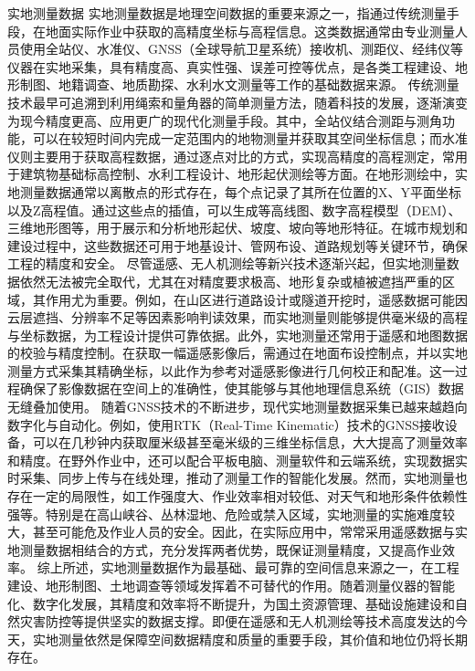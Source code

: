 {{实地测量数据}\label{ux5b9eux5730ux6d4bux91cfux6570ux636e}
实地测量数据是地理空间数据的重要来源之一，指通过传统测量手段，在地面实际作业中获取的高精度坐标与高程信息。这类数据通常由专业测量人员使用全站仪、水准仪、GNSS（全球导航卫星系统）接收机、测距仪、经纬仪等仪器在实地采集，具有精度高、真实性强、误差可控等优点，是各类工程建设、地形制图、地籍调查、地质勘探、水利水文测量等工作的基础数据来源。
传统测量技术最早可追溯到利用绳索和量角器的简单测量方法，随着科技的发展，逐渐演变为现今精度更高、应用更广的现代化测量手段。其中，全站仪结合测距与测角功能，可以在较短时间内完成一定范围内的地物测量并获取其空间坐标信息；而水准仪则主要用于获取高程数据，通过逐点对比的方式，实现高精度的高程测定，常用于建筑物基础标高控制、水利工程设计、地形起伏测绘等方面。在地形测绘中，实地测量数据通常以离散点的形式存在，每个点记录了其所在位置的X、Y平面坐标以及Z高程值。通过这些点的插值，可以生成等高线图、数字高程模型（DEM）、三维地形图等，用于展示和分析地形起伏、坡度、坡向等地形特征。在城市规划和建设过程中，这些数据还可用于地基设计、管网布设、道路规划等关键环节，确保工程的精度和安全。
尽管遥感、无人机测绘等新兴技术逐渐兴起，但实地测量数据依然无法被完全取代，尤其在对精度要求极高、地形复杂或植被遮挡严重的区域，其作用尤为重要。例如，在山区进行道路设计或隧道开挖时，遥感数据可能因云层遮挡、分辨率不足等因素影响判读效果，而实地测量则能够提供毫米级的高程与坐标数据，为工程设计提供可靠依据。此外，实地测量还常用于遥感和地图数据的校验与精度控制。在获取一幅遥感影像后，需通过在地面布设控制点，并以实地测量方式采集其精确坐标，以此作为参考对遥感影像进行几何校正和配准。这一过程确保了影像数据在空间上的准确性，使其能够与其他地理信息系统（GIS）数据无缝叠加使用。
随着GNSS技术的不断进步，现代实地测量数据采集已越来越趋向数字化与自动化。例如，使用RTK（Real-Time
Kinematic）技术的GNSS接收设备，可以在几秒钟内获取厘米级甚至毫米级的三维坐标信息，大大提高了测量效率和精度。在野外作业中，还可以配合平板电脑、测量软件和云端系统，实现数据实时采集、同步上传与在线处理，推动了测量工作的智能化发展。然而，实地测量也存在一定的局限性，如工作强度大、作业效率相对较低、对天气和地形条件依赖性强等。特别是在高山峡谷、丛林湿地、危险或禁入区域，实地测量的实施难度较大，甚至可能危及作业人员的安全。因此，在实际应用中，常常采用遥感数据与实地测量数据相结合的方式，充分发挥两者优势，既保证测量精度，又提高作业效率。
综上所述，实地测量数据作为最基础、最可靠的空间信息来源之一，在工程建设、地形制图、土地调查等领域发挥着不可替代的作用。随着测量仪器的智能化、数字化发展，其精度和效率将不断提升，为国土资源管理、基础设施建设和自然灾害防控等提供坚实的数据支撑。即便在遥感和无人机测绘等技术高度发达的今天，实地测量依然是保障空间数据精度和质量的重要手段，其价值和地位仍将长期存在。
}

